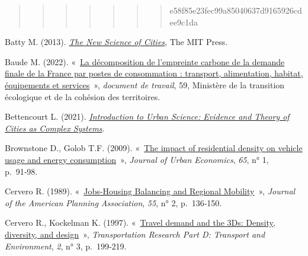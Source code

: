 \documentclass[
  9pt,
  a4paper,
  DIV=11]{scrreprt}
\newlength{\cslhangindent}
\newenvironment{CSLReferences}[2] %
 {\begin{list}{}{%
  \setlength{\itemindent}{0pt}
  \setlength{\leftmargin}{0pt}
  \setlength{\parsep}{0pt}
  \ifodd #1
   \setlength{\leftmargin}{\cslhangindent}
   \setlength{\itemindent}{-1\cslhangindent}
  \fi
  \setlength{\itemsep}{#2\baselineskip}}}
 {\end{list}}
\begin{document}
\begin{quote}
\begin{quote}
\begin{quote}
\begin{quote}
\begin{quote}
\begin{quote}
\begin{quote}
e58f85e23fec99a85040637d9165926cdee9c1da
\end{quote}
\end{quote}
\end{quote}
\end{quote}
\end{quote}
\end{quote}
\end{quote}

\label{refs}
\begin{CSLReferences}{0}{1}
Batty M. (2013).
\emph{\href{https://doi.org/10.7551/mitpress/9399.001.0001}{The New
Science of Cities}}, The MIT Press.

Baude M. (2022).
{«~\href{https://www.statistiques.developpement-durable.gouv.fr/sites/default/files/2022-07/document_travail_59_decomposition_empreinte_carbone_juillet2022.pdf}{La
décomposition de l'empreinte carbone de la demande finale de la France
par postes de consommation : transport, alimentation, habitat,
équipements et services}~»}, \emph{document de travail}, 59, Ministère
de la transition écologique et de la cohésion des territoires.

Bettencourt L. (2021).
\emph{\href{https://doi.org/10.7551/mitpress/13909.001.0001}{Introduction
to Urban Science: Evidence and Theory of Cities as Complex Systems}}.

Brownstone D., Golob T.F. (2009).
{«~\href{https://doi.org/10.1016/j.jue.2008.09.002}{The impact of
residential density on vehicle usage and energy consumption}~»},
\emph{Journal of Urban Economics}, \emph{65}, n° 1, p.~91‑98.

Cervero R. (1989).
{«~\href{https://doi.org/10.1080/01944368908976014}{Jobs-Housing
Balancing and Regional Mobility}~»}, \emph{Journal of the American
Planning Association}, \emph{55}, n° 2, p.~136‑150.

Cervero R., Kockelman K. (1997).
{«~\href{https://doi.org/10.1016/S1361-9209(97)00009-6}{Travel demand
and the 3Ds: Density, diversity, and design}~»}, \emph{Transportation
Research Part D: Transport and Environment}, \emph{2}, n° 3, p.~199‑219.


\end{CSLReferences}
\end{document}
